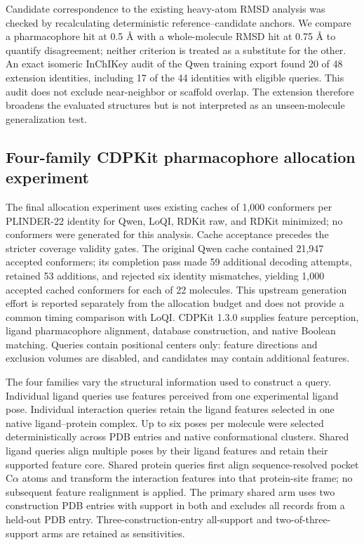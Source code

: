 Candidate correspondence to the existing heavy-atom RMSD analysis was checked by
recalculating deterministic reference--candidate anchors. We compare a pharmacophore
hit at 0.5 \AA{} with a whole-molecule RMSD hit at 0.75 \AA{} to quantify disagreement;
neither criterion is treated as a substitute for the other. An exact isomeric
InChIKey audit of the Qwen training export found 20 of 48 extension identities,
including 17 of the 44 identities with eligible queries. This audit does not exclude
near-neighbor or scaffold overlap. The extension therefore broadens the evaluated
structures but is not interpreted as an unseen-molecule generalization test.

\subsection*{Four-family CDPKit pharmacophore allocation experiment}

The final allocation experiment uses existing caches of 1,000 conformers per
PLINDER-22 identity for Qwen, LoQI, RDKit raw, and RDKit minimized; no conformers
were generated for this analysis. Cache acceptance precedes the stricter coverage
validity gates. The original Qwen cache contained 21,947 accepted conformers; its
completion pass made 59 additional decoding attempts, retained 53 additions, and
rejected six identity mismatches, yielding 1,000 accepted cached conformers for each
of 22 molecules. This upstream generation effort is reported separately from the
allocation budget and does not provide a common timing comparison with LoQI. CDPKit
1.3.0 supplies feature perception, ligand
pharmacophore alignment, database construction, and native Boolean matching.
Queries contain positional centers only: feature directions and exclusion volumes
are disabled, and candidates may contain additional features.

The four families vary the structural information used to construct a query.
Individual ligand queries use features perceived from one experimental ligand pose.
Individual interaction queries retain the ligand features selected in one native
ligand--protein complex. Up to six poses per molecule were selected
deterministically across PDB entries and native conformational clusters. Shared
ligand queries align multiple poses by their ligand features and retain their
supported feature core. Shared protein queries first align sequence-resolved pocket
C$\alpha$ atoms and transform the interaction features into that protein-site frame;
no subsequent feature realignment is applied. The primary shared arm uses two
construction PDB entries with support in both and excludes all records from a held-out
PDB entry. Three-construction-entry all-support and two-of-three-support arms are
retained as sensitivities.

